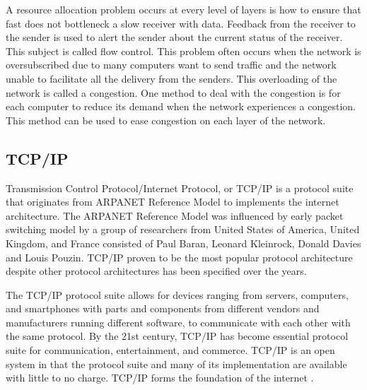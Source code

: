 A resource allocation problem occurs at every level of layers is how to ensure that fast does not bottleneck a slow receiver with data. Feedback from the receiver to the sender is used to alert the sender about the current status of the receiver. This subject is called flow control. This problem often occurs when the network is oversubscribed due to many computers want to send traffic and the network unable to facilitate all the delivery from the senders. This overloading of the network is called a congestion. One method to deal with the congestion is for each computer to reduce its demand when the network experiences a congestion. This method can be used to ease congestion on each layer of the network.

\subsection{TCP/IP}
Transmission Control Protocol/Internet Protocol, or TCP/IP is a protocol suite that originates from ARPANET Reference Model to implements the internet architecture. The ARPANET Reference Model was influenced by early packet switching model by a group of researchers from United States of America, United Kingdom, and France consisted of Paul Baran, Leonard Kleinrock, Donald Davies and Louis Pouzin. TCP/IP proven to be the most popular protocol architecture despite other protocol architectures has been specified over the years.

The TCP/IP protocol suite allows for devices ranging from servers, computers, and smartphones with parts and components from different vendors and manufacturers running different software, to communicate with each other with the same protocol. By the 21st century, TCP/IP has become essential protocol suite for communication, entertainment, and commerce. TCP/IP is an open system in that the protocol suite and many of its implementation are available with little to no charge. TCP/IP forms the foundation of the internet \cite{FallBook}.

